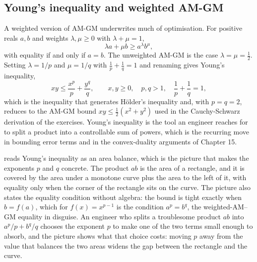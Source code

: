 \subsection{Young's inequality and weighted AM-GM}

A weighted version of AM-GM underwrites much of optimisation. For
positive reals $a, b$ and weights $\lambda, \mu \geq 0$ with $\lambda
+ \mu = 1$,
\[
\lambda a + \mu b \geq a^{\lambda} b^{\mu},
\]
with equality if and only if $a = b$. The unweighted AM-GM is the case
$\lambda = \mu = \tfrac{1}{2}$. Setting $\lambda = 1/p$ and $\mu = 1/q$
with $\tfrac{1}{p} + \tfrac{1}{q} = 1$ and renaming gives Young's
inequality,
\[
xy \leq \frac{x^{p}}{p} + \frac{y^{q}}{q},
\qquad x, y \geq 0, \quad p, q > 1, \quad \frac{1}{p} + \frac{1}{q} = 1,
\]
which is the inequality that generates Hölder's inequality and, with
$p = q = 2$, reduces to the AM-GM bound $xy \leq \tfrac{1}{2}(x^{2} +
y^{2})$ used in the Cauchy-Schwarz derivation of the exercises. Young's
inequality is the tool an engineer reaches for to split a product into
a controllable sum of powers, which is the recurring move in bounding
error terms and in the convex-duality arguments of Chapter 15.



 reads Young's inequality as an
area balance, which is the picture that makes the exponents $p$ and $q$
concrete. The product $ab$ is the area of a rectangle, and it is covered
by the area under a monotone curve plus the area to the left of it, with
equality only when the corner of the rectangle sits on the curve. The
picture also states the equality condition without algebra: the bound is
tight exactly when $b = f(a)$, which for $f(x) = x^{p-1}$ is the
condition $a^{p} = b^{q}$, the weighted-AM--GM equality in disguise. An
engineer who splits a troublesome product $ab$ into $a^{p}/p + b^{q}/q$
chooses the exponent $p$ to make one of the two terms small enough to
absorb, and the picture shows what that choice costs: moving $p$ away
from the value that balances the two areas widens the gap between the
rectangle and the curve.

